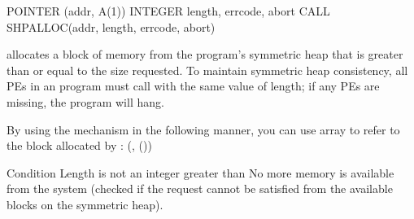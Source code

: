 \cbstart \synF   %

POINTER (addr, A(1))
INTEGER length, errcode, abort
CALL SHPALLOC(addr, length, errcode, abort) %
\cbend

 {   
        allocates a block of memory from the program's symmetric heap
       that is greater than or equal to the size requested. To maintain symmetric heap 
       consistency, all \ac{PE}s in an program must call  with the same value of length; if any  \ac{PE}s are missing, the program will hang.
       
       By using the \Fortran{}  mechanism in the following manner, you can use array  to refer to the block allocated by :  (,
       ())
  }
{
{
\desR{ }
 {Condition}
 {Length is not an integer greater than }
 { No more memory is available from the system (checked if the  request cannot be satisfied from the available blocks on the symmetric heap).}
}%
}
\eAPI 
